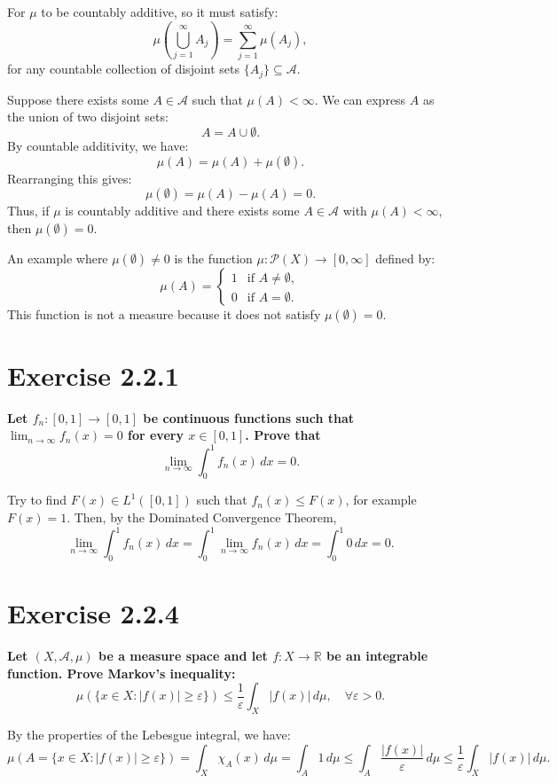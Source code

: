 \documentclass[11pt]{article}
\newcommand{\card}[1]{\lvert #1 \rvert}
\begin{document}
For \(\mu\) to be countably additive, so it must satisfy:
\[\mu\left(\bigcup_{j=1}^{\infty} A_j\right) = \sum_{j=1}^{\infty} \mu(A_j),\]
for any countable collection of disjoint sets \(\{A_j\} \subseteq \mathcal{A}\).

Suppose there exists some \(A \in \mathcal{A}\) such that \(\mu(A) < \infty\). We can express \(A\) as the union of two disjoint sets:
\[A = A \cup \emptyset.\]
By countable additivity, we have:
\[\mu(A) = \mu(A) + \mu(\emptyset).\]
Rearranging this gives:
\[\mu(\emptyset) = \mu(A) - \mu(A) = 0.\]
Thus, if \(\mu\) is countably additive and there exists some \(A \in \mathcal{A}\) with \(\mu(A) < \infty\), then \(\mu(\emptyset) = 0\).

An example where \(\mu(\emptyset) \neq 0\) is the function \(\mu : \mathcal{P}(X) \to [0, \infty]\) defined by:
\[\mu(A) = \begin{cases}
1 & \text{if } A \neq \emptyset, \\
0 & \text{if } A = \emptyset.
\end{cases}\]
This function is not a measure because it does not satisfy \(\mu(\emptyset) = 0\).

\section*{Exercise 2.2.1}
\textbf{\large Let \(f_n : [0,1] \to [0, 1]\) be continuous functions such that \(\lim_{n \to \infty} f_n(x) = 0\) for every \(x \in [0,1]\). Prove that 
\[\lim_{n \to \infty} \int_{0}^{1} f_n(x) \, dx = 0.\]}

Try to find \(F(x) \in L^1([0, 1])\) such that \(f_n(x) \leq F(x)\), for example \(F(x) = 1\). Then, by the Dominated Convergence Theorem,
\[\lim_{n \to \infty} \int_{0}^{1} f_n(x) \, dx = \int_{0}^{1} \lim_{n \to \infty} f_n(x) \, dx = \int_{0}^{1} 0 \, dx = 0.\]

\section{Exercise 2.2.4}
\textbf{\large Let \((X, \mathcal{A}, \mu)\) be a measure space and let \(f : X \to \mathbb{R}\) be an integrable function. Prove Markov's inequality:}
\[\mu(\{x \in X : \card{f(x)} \geq \varepsilon\}) \leq \dfrac{1}{\varepsilon} \int_{X} \card{f(x)} \, d\mu, \quad \forall \varepsilon > 0.\]

By the properties of the Lebesgue integral, we have:
\[\mu(A = \{x \in X : |f(x)| \geq \varepsilon\}) = \int_{X} \chi_{A} (x)\, d\mu = \int_{A} 1 \, d\mu \leq \int_{A} \dfrac{|f(x)|}{\varepsilon} \, d\mu \leq \dfrac{1}{\varepsilon} \int_{X} |f(x)| \, d\mu.\]
\end{document}
